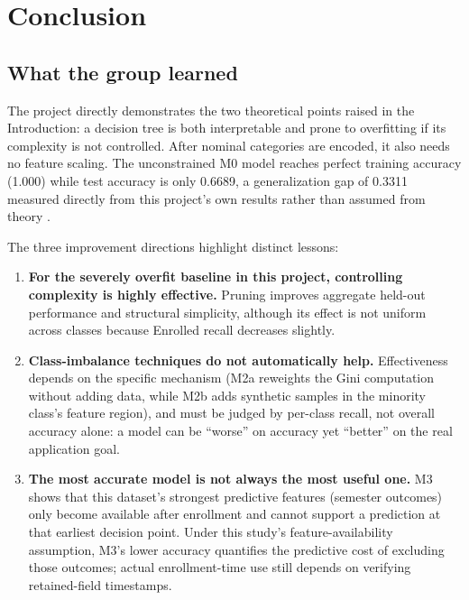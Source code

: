 
\section{Conclusion}
\label{sec:h}

\subsection{What the group learned}

The project directly demonstrates the two theoretical points raised in
the Introduction: a decision tree is both interpretable and prone to
overfitting if its complexity is not controlled. After nominal categories
are encoded, it also needs no feature scaling. The unconstrained M0 model
reaches perfect training accuracy (1.000) while test accuracy is only
0.6689, a generalization gap of 0.3311 measured directly from this
project's own results rather than assumed from theory
\citep{breiman1984classification, mitchell1997machine}.

The three improvement directions highlight distinct lessons:

\begin{enumerate}
  \item \textbf{For the severely overfit baseline in this project,
    controlling complexity is highly effective.} Pruning improves aggregate
    held-out performance and structural simplicity, although its effect is
    not uniform across classes because Enrolled recall decreases slightly.
  \item \textbf{Class-imbalance techniques do not automatically help.}
    Effectiveness depends on the specific mechanism (M2a reweights the
    Gini computation without adding data, while M2b adds synthetic
    samples in the minority class's feature region), and must be judged
    by per-class recall, not overall accuracy alone: a model can be
    ``worse'' on accuracy yet ``better'' on the real application goal.
  \item \textbf{The most accurate model is not always the most useful
    one.} M3 shows that this dataset's strongest predictive features
    (semester outcomes) only become available after enrollment and cannot
    support a prediction at that earliest decision point. Under this study's
    feature-availability assumption, M3's lower
    accuracy quantifies the predictive cost of excluding those outcomes;
    actual enrollment-time use still depends on verifying retained-field
    timestamps.
\end{enumerate}

